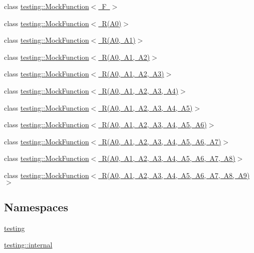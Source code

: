 \begin{DoxyCompactItemize}
\item 
class \mbox{\hyperlink{classtesting_1_1MockFunction}{testing\+::\+Mock\+Function$<$ F $>$}}
\item 
class \mbox{\hyperlink{classtesting_1_1MockFunction_3_01R_07A0_08_4}{testing\+::\+Mock\+Function$<$ R(\+A0)$>$}}
\item 
class \mbox{\hyperlink{classtesting_1_1MockFunction_3_01R_07A0_00_01A1_08_4}{testing\+::\+Mock\+Function$<$ R(\+A0, A1)$>$}}
\item 
class \mbox{\hyperlink{classtesting_1_1MockFunction_3_01R_07A0_00_01A1_00_01A2_08_4}{testing\+::\+Mock\+Function$<$ R(\+A0, A1, A2)$>$}}
\item 
class \mbox{\hyperlink{classtesting_1_1MockFunction_3_01R_07A0_00_01A1_00_01A2_00_01A3_08_4}{testing\+::\+Mock\+Function$<$ R(\+A0, A1, A2, A3)$>$}}
\item 
class \mbox{\hyperlink{classtesting_1_1MockFunction_3_01R_07A0_00_01A1_00_01A2_00_01A3_00_01A4_08_4}{testing\+::\+Mock\+Function$<$ R(\+A0, A1, A2, A3, A4)$>$}}
\item 
class \mbox{\hyperlink{classtesting_1_1MockFunction_3_01R_07A0_00_01A1_00_01A2_00_01A3_00_01A4_00_01A5_08_4}{testing\+::\+Mock\+Function$<$ R(\+A0, A1, A2, A3, A4, A5)$>$}}
\item 
class \mbox{\hyperlink{classtesting_1_1MockFunction_3_01R_07A0_00_01A1_00_01A2_00_01A3_00_01A4_00_01A5_00_01A6_08_4}{testing\+::\+Mock\+Function$<$ R(\+A0, A1, A2, A3, A4, A5, A6)$>$}}
\item 
class \mbox{\hyperlink{classtesting_1_1MockFunction_3_01R_07A0_00_01A1_00_01A2_00_01A3_00_01A4_00_01A5_00_01A6_00_01A7_08_4}{testing\+::\+Mock\+Function$<$ R(\+A0, A1, A2, A3, A4, A5, A6, A7)$>$}}
\item 
class \mbox{\hyperlink{classtesting_1_1MockFunction_3_01R_07A0_00_01A1_00_01A2_00_01A3_00_01A4_00_01A5_00_01A6_00_01A7_00_01A8_08_4}{testing\+::\+Mock\+Function$<$ R(\+A0, A1, A2, A3, A4, A5, A6, A7, A8)$>$}}
\item 
class \mbox{\hyperlink{classtesting_1_1MockFunction_3_01R_07A0_00_01A1_00_01A2_00_01A3_00_01A4_00_01A5_00_01A6_00_01A7_00_01A8_00_01A9_08_4}{testing\+::\+Mock\+Function$<$ R(\+A0, A1, A2, A3, A4, A5, A6, A7, A8, A9)$>$}}
\end{DoxyCompactItemize}
\subsection*{Namespaces}
\begin{DoxyCompactItemize}
\item 
 \mbox{\hyperlink{namespacetesting}{testing}}
\item 
 \mbox{\hyperlink{namespacetesting_1_1internal}{testing\+::internal}}
\end{DoxyCompactItemize}
